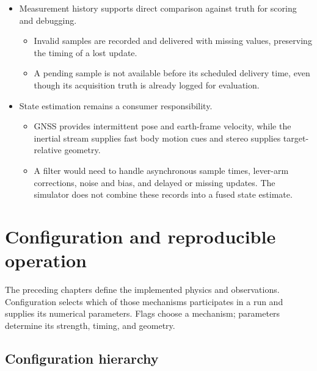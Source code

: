 \documentclass[10pt,letterpaper]{article}
\begin{document}
\begin{itemize}
\item
  Measurement history supports direct comparison against truth for scoring and debugging.

  \begin{itemize}
  \item
    Invalid samples are recorded and delivered with missing values, preserving the timing of a lost update.
  \item
    A pending sample is not available before its scheduled delivery time, even though its acquisition truth is already logged for evaluation.
  \end{itemize}
\item
  State estimation remains a consumer responsibility.

  \begin{itemize}
  \item
    GNSS provides intermittent pose and earth-frame velocity, while the inertial stream supplies fast body motion cues and stereo supplies target-relative geometry.
  \item
    A filter would need to handle asynchronous sample times, lever-arm corrections, noise and bias, and delayed or missing updates. The simulator does not combine these records into a fused state estimate.
  \end{itemize}
\end{itemize}

\section{Configuration and reproducible operation}\label{cfg-chapter}

The preceding chapters define the implemented physics and observations. Configuration selects which of those mechanisms participates in a run and supplies its numerical parameters. Flags choose a mechanism; parameters determine its strength, timing, and geometry.

\subsection{Configuration hierarchy}
\end{document}
